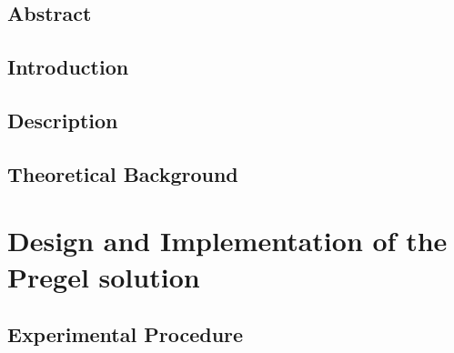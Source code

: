 \documentclass{legrand}
\begin{document}







\setcounter{page}{0}
\chapter*{Abstract}



\tableofcontents

\listoffigures

\listoftables


\chapter{Introduction}
\setcounter{page}{0} %
\label{chapter:intro}


\chapter{Description}
\label{chapter:description}


\chapter{Theoretical Background}
\label{chapter:theory}


\part{Design and Implementation of the Pregel solution}

\chapter{Experimental Procedure}
\label{chapter:experiment}

\end{document}
